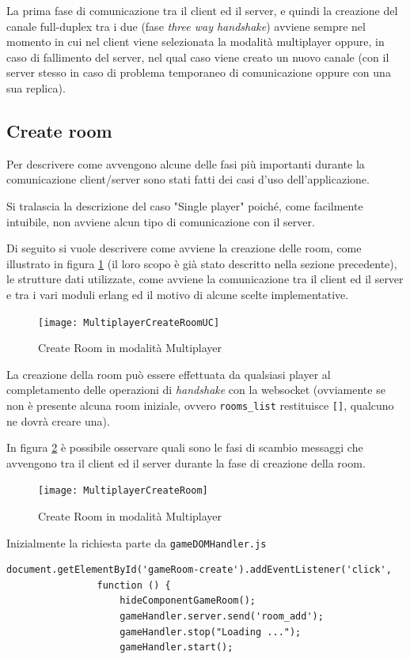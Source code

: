 \documentclass[paper=a4, fontsize=11pt]{scrartcl} %
\numberwithin{equation}{section} %
\numberwithin{figure}{section} %
\numberwithin{table}{section} %
\begin{document}
La prima fase di comunicazione tra il client ed il server, e quindi la creazione del canale full-duplex tra i due (fase \textit{three way handshake}) avviene sempre nel momento in cui nel client viene selezionata la modalità multiplayer oppure, in caso di fallimento del server, nel qual caso viene creato un nuovo canale (con il server stesso in caso di problema temporaneo di comunicazione oppure con una sua replica).
\subsection{Create room}
Per descrivere come avvengono alcune delle fasi più importanti durante la comunicazione client/server sono stati fatti dei casi d'uso dell'applicazione.

Si tralascia la descrizione del caso "Single player" poiché, come facilmente intuibile, non avviene alcun tipo di comunicazione con il server.

Di seguito si vuole descrivere come avviene la creazione delle room, come illustrato in figura \ref{CreateRoomUC} (il loro scopo è già stato descritto nella sezione precedente), le strutture dati utilizzate, come avviene la comunicazione tra il client ed il server e tra i vari moduli erlang ed il motivo di alcune scelte implementative.

\begin{figure}
\centering
\texttt{[image: MultiplayerCreateRoomUC]}
\caption{Create Room in modalità Multiplayer}
\label{CreateRoomUC}
\end{figure}

La creazione della room può essere effettuata da qualsiasi player al completamento delle operazioni di \textit{handshake} con la websocket (ovviamente se non è presente alcuna room iniziale, ovvero \texttt{rooms\_list} restituisce \texttt{[]}, qualcuno ne dovrà creare una).

In figura \ref{CreateRoom} è possibile osservare quali sono le fasi di scambio messaggi che avvengono tra il client ed il server durante la fase di creazione della room.

\begin{figure}
\centering
\texttt{[image: MultiplayerCreateRoom]}
\caption{Create Room in modalità Multiplayer}
\label{CreateRoom}
\end{figure}


Inizialmente la richiesta parte da \texttt{gameDOMHandler.js}

\begin{lstlisting}[basicstyle=\footnotesize]
document.getElementById('gameRoom-create').addEventListener('click',
				function () {
                    hideComponentGameRoom();
                    gameHandler.server.send('room_add');
                    gameHandler.stop("Loading ...");
                    gameHandler.start();
\end{lstlisting}
\end{document}
